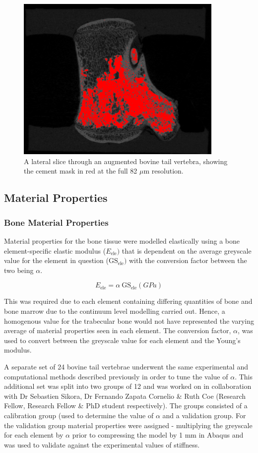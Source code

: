 \begin{figure}[hbt]
\centering

  \includegraphics[width=10cm]{images/fullres_VP_segment.png}
  \caption{A lateral slice through an augmented bovine tail vertebra, showing
the cement mask in red at the full 82 $\mu$m resolution.}
\label{fig:fullressVPseg}
\end{figure}


\subsection{Material Properties}\label{material-properties-bov}

\subsubsection{Bone Material Properties}

Material properties for the bone tissue were modelled elastically using a bone
element-specific elastic modulus (\(E_{\text{ele}})\) that is dependent on the
average greyscale value for the element in question
(\(\text{GS}_{\text{ele}})\) with the conversion factor between the two being
$\alpha$.

\[E_{\text{ele}} = \alpha\ \text{GS}_{\text{ele}} (GPa)\]

This was required due to each element containing differing quantities of bone
and bone marrow due to the continuum level modelling carried out. Hence, a
homogenous value for the trabecular bone would not have represented the varying
average of material properties seen in each element. The conversion
factor, $\alpha$, was used to convert between the greyscale value for each
element and the Young's modulus.

A separate set of 24 bovine tail vertebrae underwent the same experimental and
computational methods described previously in order to tune the value of
$\alpha$. This
additional set was split into two groups of 12 and was worked on in collaboration with Dr Sebastien Sikora, Dr
Fernando Zapata Cornelio \& Ruth Coe (Research Fellow, Research Fellow \& PhD
student respectively).  The groups consisted of a calibration group (used to
determine the value of $\alpha$ and a validation group. For the validation
group material properties were assigned - multiplying the greyscale for each
element by \(\alpha\) prior to compressing the model by 1 mm in Abaqus and was
used to validate against the experimental values of stiffness.

